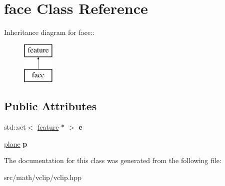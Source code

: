 \hypertarget{classface}{
\section{face Class Reference}
\label{classface}
}
Inheritance diagram for face::\begin{figure}[H]
\begin{center}
\leavevmode
\includegraphics[height=2cm]{classface}
\end{center}
\end{figure}
\subsection*{Public Attributes}
\begin{DoxyCompactItemize}
\item 
\hypertarget{classface_a11e8c57124ede77de5842c52e10472c8}{
std::set$<$ \hyperlink{classfeature}{feature} $\ast$ $>$ {\bfseries e}}
\label{classface_a11e8c57124ede77de5842c52e10472c8}

\item 
\hypertarget{classface_ae494cf85c810c1014bf424e7a39eeaee}{
\hyperlink{classplane}{plane} {\bfseries p}}
\label{classface_ae494cf85c810c1014bf424e7a39eeaee}

\end{DoxyCompactItemize}


The documentation for this class was generated from the following file:\begin{DoxyCompactItemize}
\item 
src/math/vclip/vclip.hpp\end{DoxyCompactItemize}
